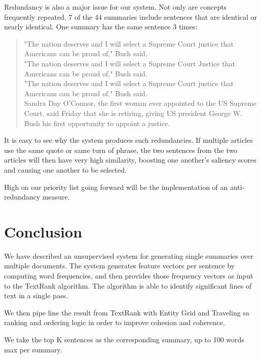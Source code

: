 \documentclass[11pt]{article}
\begin{document}
	Redundancy is also a major issue for our system. Not only are concepts frequently repeated, 7 of the 44 summaries include sentences that are identical or nearly identical. One summary has the same sentence 3 times:\\
	
	\begin{quote}
		"The nation deserves and I will select a Supreme Court justice that Americans can be proud of," Bush said.\\
		"The nation deserves and I will select a Supreme Court Justice that Americans can be proud of," Bush said.\\
		"The nation deserves and I will select a Supreme Court justice that Americans can be proud of," Bush said.\\
		Sandra Day O'Connor, the first  woman ever appointed to the US Supreme Court, said Friday that she is retiring, giving US president George W. Bush his first  opportunity to appoint a justice.
	\end{quote}
	
	It is easy to see why the system produces such redundancies. If multiple articles use the same quote or same turn of phrase, the two sentences from the two articles will then have very high similarity, boosting one another's saliency scores and causing one another to be selected.
	
	High on our priority list going forward will be the implementation of an anti-redundancy measure.
	
	
	\section{Conclusion}
	We have described an unsupervised system for generating single summaries over multiple documents. The system generates feature vectors per sentence by computing word frequencies, and then provides those frequency vectors as input to the TextRank algorithm. The algorithm is able to identify significant lines of text in a single pass. 
	
	We then pipe line the result from TextRank with Entity Grid and Traveling sa ranking and ordering logic in order to improve cohesion and coherence.
	
	We take the top K sentences as the corresponding summary, up to 100 words max per summary.
	
	
\end{document}
